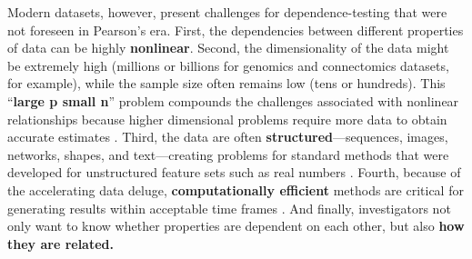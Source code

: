 \documentclass[11pt]{article}
\begin{document}
Modern datasets, however, present  challenges for dependence-testing that were not foreseen in Pearson's era.
%
First, the dependencies between different properties 
of data can be highly \textbf{nonlinear}.
% 
Second, the dimensionality of the data might be extremely high (millions or billions for genomics and connectomics datasets, for example), while the sample size often remains low (tens or hundreds).  This ``\textbf{large p small n}'' problem compounds the challenges associated with nonlinear relationships because higher dimensional problems require more data to obtain accurate estimates \cite{johnstone2009statistical}.
% 
Third, the data are often \textbf{structured}---sequences, images, networks, shapes, and text---creating problems for standard methods that were developed for unstructured feature sets such as real numbers \cite{bakir2007predicting}.
% 
Fourth, because of the accelerating data deluge,  \textbf{computationally efficient} methods are critical for generating results within acceptable time frames \cite{hey2009fourth}.
%
And finally, investigators not only want to know {whether}  properties are dependent on each other, but also \textbf{how they are related.}
\end{document}
